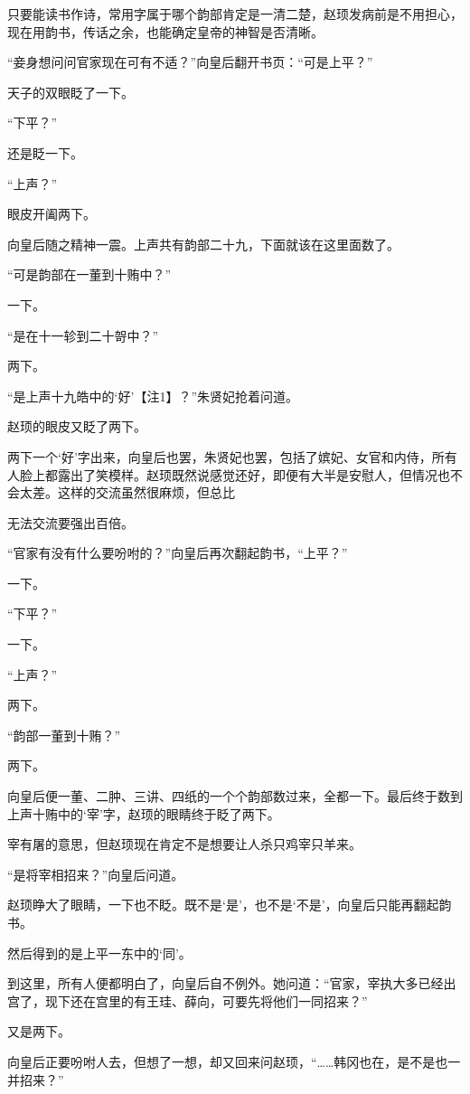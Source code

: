 只要能读书作诗，常用字属于哪个韵部肯定是一清二楚，赵顼发病前是不用担心，现在用韵书，传话之余，也能确定皇帝的神智是否清晰。

“妾身想问问官家现在可有不适？”向皇后翻开书页：“可是上平？”

天子的双眼眨了一下。

“下平？”

还是眨一下。

“上声？”

眼皮开阖两下。

向皇后随之精神一震。上声共有韵部二十九，下面就该在这里面数了。

“可是韵部在一董到十贿中？”

一下。

“是在十一轸到二十哿中？”

两下。

“是上声十九皓中的‘好’【注1】？”朱贤妃抢着问道。

赵顼的眼皮又眨了两下。

两下一个‘好’字出来，向皇后也罢，朱贤妃也罢，包括了嫔妃、女官和内侍，所有人脸上都露出了笑模样。赵顼既然说感觉还好，即便有大半是安慰人，但情况也不会太差。这样的交流虽然很麻烦，但总比

无法交流要强出百倍。

“官家有没有什么要吩咐的？”向皇后再次翻起韵书，“上平？”

一下。

“下平？”

一下。

“上声？”

两下。

“韵部一董到十贿？”

两下。

向皇后便一董、二肿、三讲、四纸的一个个韵部数过来，全都一下。最后终于数到上声十贿中的‘宰’字，赵顼的眼睛终于眨了两下。

宰有屠的意思，但赵顼现在肯定不是想要让人杀只鸡宰只羊来。

“是将宰相招来？”向皇后问道。

赵顼睁大了眼睛，一下也不眨。既不是‘是’，也不是‘不是’，向皇后只能再翻起韵书。

然后得到的是上平一东中的‘同’。

到这里，所有人便都明白了，向皇后自不例外。她问道：“官家，宰执大多已经出宫了，现下还在宫里的有王珪、薛向，可要先将他们一同招来？”

又是两下。

向皇后正要吩咐人去，但想了一想，却又回来问赵顼，“……韩冈也在，是不是也一并招来？”

